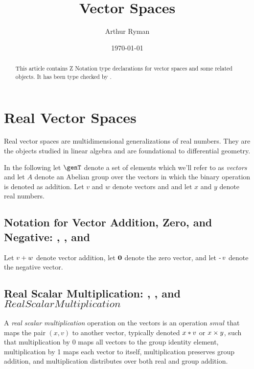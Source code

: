 \documentclass{amsart}
\begin{document}
\title{Vector Spaces}
\author{Arthur Ryman}
\date{\today}

\begin{abstract}
This article contains Z Notation type declarations for vector spaces and some related objects.
It has been type checked by \fuzz.
\end{abstract}

\maketitle

\tableofcontents

\section{Real Vector Spaces}

Real vector spaces are multidimensional generalizations of real numbers.
They are the objects studied in linear algebra and are foundational to differential geometry.

In the following let $\genT$ denote a set of elements which we'll refer to as {\em vectors}
and let $A$ denote an Abelian group over the vectors in which the binary operation is denoted as addition.
Let $v$ and $w$ denote vectors and
and let $x$ and $y$ denote real numbers.

\subsection{Notation for Vector Addition, Zero, and Negative: , , and }

Let $v \mathbin{+} w$ denote vector addition,
let $\mathbf{0}$ denote the zero vector,
and let $\operatorname{-} v$ denote the negative vector.

\subsection{Real Scalar Multiplication: , , and $RealScalarMultiplication$}

A {\em real scalar multiplication} operation on the vectors is an operation $smul$ 
that maps the pair $(x, v)$ to another vector, typically denoted $x \mathbin{*} v$ or $x \mathbin{\times} y$,
such that
multiplication by 0 maps all vectors to the group identity element,
multiplication by 1 maps each vector to itself,
multiplication preserves group addition, 
and multiplication distributes over both real and group addition.
\end{document}
